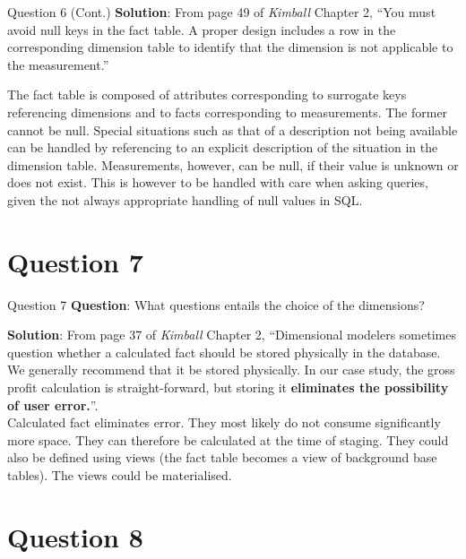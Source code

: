 \begin{frame}[fragile]{Question 6 (Cont.)}
	\textbf{Solution}: From page 49 of \textit{Kimball} Chapter 2, ``You must avoid null keys in the fact table. A proper design includes a row in the corresponding dimension table to identify that the dimension is not applicable to the measurement.''\\\vspace{5pt}
	
	The fact table is composed of attributes corresponding to surrogate keys referencing dimensions and to facts corresponding to measurements. The former cannot be null. Special situations such as that of a description not being available can be handled by referencing to an explicit description of the situation in the dimension table. Measurements, however, can be null, if their value is unknown or does not exist. This is however to be handled with care when asking queries, given the not always appropriate handling of null values in SQL.
\end{frame}
\section*{Question 7}

\begin{frame}[fragile]{Question 7}
	\textbf{Question}: What questions entails the choice of the dimensions?\\\vspace{10pt}
	
	\textbf{Solution}: From page 37 of \textit{Kimball} Chapter 2, ``Dimensional modelers sometimes question whether a calculated fact should be stored physically in the database. We generally recommend that it be stored
	physically. In our case study, the gross profit calculation is straight-forward, but storing it \textbf{eliminates	the possibility of user error.}''. \\\vspace{5pt}
	Calculated fact eliminates error. They most likely do not consume
	significantly more space. They can therefore be calculated at the time of staging. They could also be defined using views (the fact table becomes a view of background base tables). The views could be materialised.
\end{frame}

\section*{Question 8}

